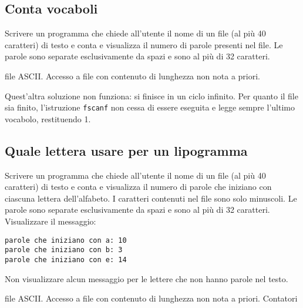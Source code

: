\subsection{Conta vocaboli}
Scrivere un programma che chiede all'utente il nome di un file (al pi\`u 40 caratteri) di testo e conta e visualizza il numero di parole presenti nel file. Le parole sono separate esclusivamente da spazi e sono al pi\`u di 32 caratteri.

\begin{tags}
file ASCII. Accesso a file con contenuto di lunghezza non nota a priori.
\end{tags}

Quest'altra soluzione non funziona: si finisce in un ciclo infinito. Per quanto il file sia finito, l'istruzione \texttt{fscanf} non cessa di essere eseguita e legge sempre l'ultimo vocabolo, restituendo 1.


\subsection{Quale lettera usare per un lipogramma}
Scrivere un programma che chiede all'utente il nome di un file (al pi\`u 40 caratteri) di testo e conta e visualizza il numero di parole che iniziano con ciascuna lettera dell'alfabeto. I caratteri contenuti nel file sono solo minuscoli. Le parole sono separate esclusivamente da spazi e sono al pi\`u di 32 caratteri. 
Visualizzare il messaggio: 
\begin{verbatim}
parole che iniziano con a: 10
parole che iniziano con b: 3
parole che iniziano con e: 14
\end{verbatim}
Non visualizzare alcun messaggio per le lettere che non hanno parole nel testo.

\begin{tags}
file ASCII. Accesso a file con contenuto di lunghezza non nota a priori. Contatori
\end{tags}
